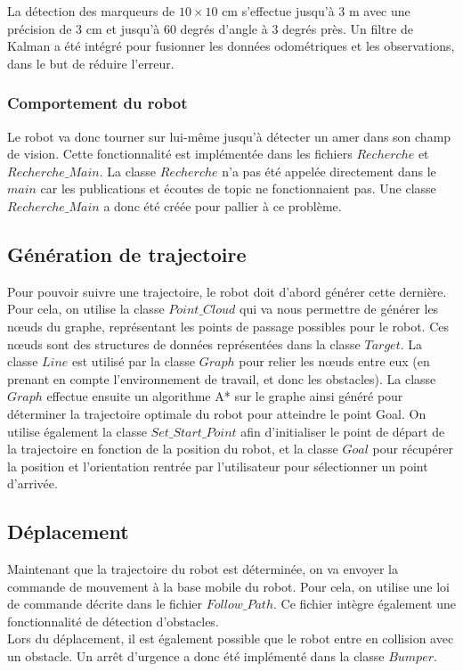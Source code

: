\documentclass[10pt,a4paper]{article}
\begin{document}
La détection des marqueurs de $10 \times 10$ cm s'effectue jusqu'à 3 m  avec une précision de 3 cm et jusqu'à 60 degrés d'angle à 3 degrés près. Un filtre de Kalman a été intégré pour fusionner les données odométriques et les observations, dans le but de réduire l'erreur.

\subsubsection{Comportement du robot}
Le robot va donc tourner sur lui-même jusqu'à détecter un amer dans son champ de vision. Cette fonctionnalité est implémentée dans les fichiers $Recherche$ et $Recherche\_Main$. La classe $Recherche$ n'a pas été appelée directement dans le $main$ car les publications et écoutes de topic ne fonctionnaient pas. Une classe $Recherche\_Main$ a donc été créée pour pallier à ce problème.


\subsection{Génération de trajectoire}
\label{sec:generation}

Pour pouvoir suivre une trajectoire, le robot doit d'abord générer cette dernière. Pour cela, on utilise la classe $Point\_Cloud$ qui va nous permettre de générer les nœuds du graphe, représentant les points de passage possibles pour le robot. Ces nœuds sont des structures de données représentées dans la classe $Target$. La classe $Line$ est utilisé par la classe $Graph$ pour relier les nœuds entre eux (en prenant en compte l'environnement de travail, et donc les obstacles). La classe $Graph$ effectue ensuite un algorithme A* sur le graphe ainsi généré pour déterminer la trajectoire optimale du robot pour atteindre le point Goal. On utilise également la classe $Set\_Start\_Point$ afin d'initialiser le point de départ de la trajectoire en fonction de la position du robot, et la classe $Goal$ pour récupérer la position et l'orientation rentrée par l'utilisateur pour sélectionner un point d'arrivée.


\subsection{Déplacement}
\label{sec:deplacement}

Maintenant que la trajectoire du robot est déterminée, on va envoyer la commande de mouvement à la base mobile du robot. Pour cela, on utilise une loi de commande décrite dans le fichier $Follow\_Path$. Ce fichier intègre également une fonctionnalité de détection d'obstacles.\\
Lors du déplacement, il est également possible que le robot entre en collision avec un obstacle. Un arrêt d'urgence a donc été implémenté dans la classe $Bumper$.
\end{document}
